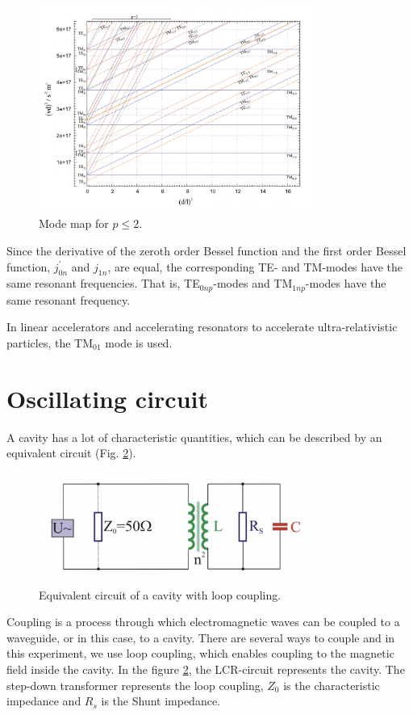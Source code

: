 \documentclass[a4paper]{report}
\numberwithin{equation}{section}
\begin{document}
\begin{figure}[hbt!]
    \centering
    \includegraphics[width=0.8\textwidth]{mode_map}
	\caption{Mode map for $p \leq 2$. \cite{Hillert}}
    \label{fig:mode}
\end{figure}

Since the derivative of the zeroth order Bessel function and the first order
Bessel function, $j^{'}_{0n}$ and $j_{1n}$, are equal, the corresponding TE- and
TM-modes have the same resonant frequencies. That is, TE$_{0np}$-modes and
TM$_{1np}$-modes have the same resonant frequency. 

In linear accelerators and accelerating resonators to accelerate ultra-relativistic particles, the TM$_{01}$ mode is used. 
\section{Oscillating circuit}
A cavity has a lot of characteristic quantities, which can be described by an
equivalent circuit (Fig. \ref{fig:circuit}). 
\begin{figure}[hbt!]
    \centering
    \includegraphics[width=0.8\textwidth]{circuit}
	\caption{Equivalent circuit of a cavity with loop coupling. \cite{Hillert}}
    \label{fig:circuit}
\end{figure}	

Coupling is a process through which electromagnetic waves can be coupled to a
waveguide, or in this case, to a cavity. There are several ways to couple and in
this experiment, we use loop coupling, which enables coupling to the magnetic
field inside the cavity. In the figure \ref{fig:circuit}, the LCR-circuit
represents the cavity. The step-down transformer represents the loop coupling,
$Z_{0}$ is the characteristic impedance and $R_{s}$ is the Shunt impedance. 
\end{document}
